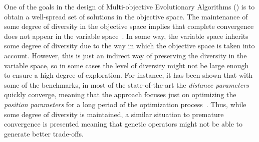 One of the goals in the design of Multi-objective Evolutionary Algorithms (\MOEAS{}) is to obtain a well-spread 
set of solutions in the objective space.
%
The maintenance of some degree of diversity in the objective space implies that complete convergence 
does not appear in the variable space~\cite{Joel:GDE3_CEC09}.
%
In some way, the variable space inherits some degree of diversity due to the way in which the objective space is 
taken into account. 
%
However, this is just an indirect way of preserving the diversity in the variable space, so 
in some cases the level of diversity might not be large enough to ensure a high degree of exploration.
%
For instance, it has been shown that with some of the \WFG{} benchmarks, in most of the state-of-the-art \MOEAS{} 
the \textit{distance parameters} quickly converge, meaning that the approach focuses just on optimizing the 
\textit{position parameters} for a long period of the optimization process~\cite{Joel:GDE3_CEC09}.
%
Thus, while some degree of diversity is maintained, a similar situation to premature convergence is presented
meaning that genetic operators might not be able to generate better trade-offs. 

